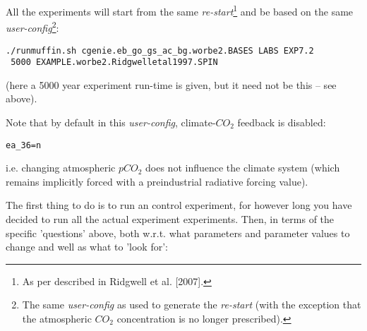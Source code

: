 \documentclass[11pt,fleqn]{book} %
\begin{document}
All the experiments will start from the same \textit{re-start}\footnote{As per described in Ridgwell et al. [2007].} and be based on the same \textit{user-config}\footnote{The same \textit{user-config} as used to generate the \textit{re-start} (with the exception that the atmospheric \(CO_{2}\) concentration is no longer prescribed).}:

\vspace{-2pt}\begin{verbatim}
./runmuffin.sh cgenie.eb_go_gs_ac_bg.worbe2.BASES LABS EXP7.2
 5000 EXAMPLE.worbe2.Ridgwelletal1997.SPIN
\end{verbatim}\vspace{-2pt}
(here a 5000 year experiment run-time is given, but it need not be this -- see above).

Note that by default in this \textit{user-config}, climate-\(CO_{2}\) feedback is disabled:
\vspace{-2pt}\begin{verbatim}
ea_36=n
\end{verbatim}\vspace{-2pt}
i.e. changing atmospheric \(pCO_{2}\) does not influence the climate system (which remains implicitly forced with a preindustrial radiative forcing value).

\pagebreak 

The first thing to do is to run an control experiment, for however long you have decided to run all the actual experiment experiments. Then, in terms of the specific 'questions' above, both w.r.t. what parameters and parameter values to change and well as what to 'look for':
\end{document}

